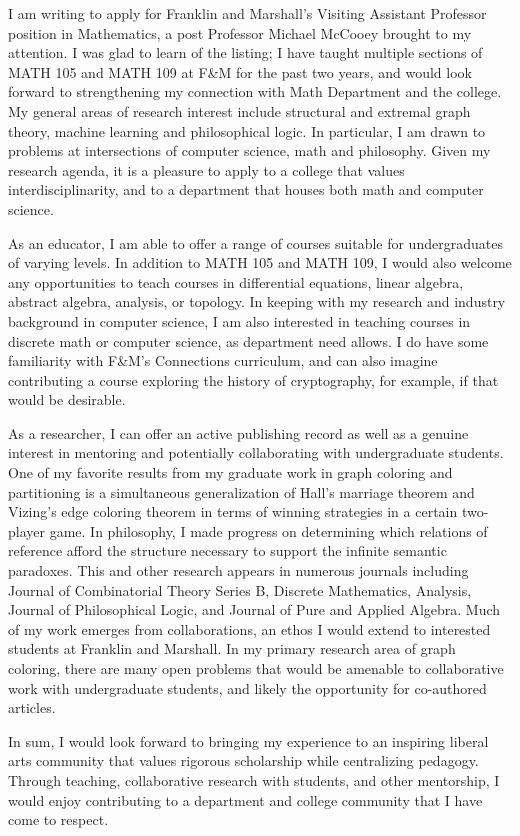 \documentclass[10pt,stdletter,dateno]{newlfm}
\begin{document}
\begin{newlfm}

I am writing to apply for Franklin and Marshall's Visiting Assistant Professor position in Mathematics, a post Professor Michael McCooey brought to my attention. 
I was glad to learn of the listing; 
I have taught multiple sections of MATH 105 and MATH 109 at F\&M for the past two years, and would look forward to strengthening my connection with Math Department 
and the college. My general areas of research interest include structural and extremal graph theory, machine learning and philosophical logic. In particular, I am 
drawn to problems at intersections of computer science, math and philosophy. Given my research agenda, it is a pleasure to apply to a college that values interdisciplinarity, 
and to a department that houses both math and computer science.  

As an educator, I am able to offer a range of courses suitable for undergraduates of varying levels. In addition to MATH 105 and MATH 109, 
I would also welcome any opportunities to teach courses in differential equations, linear algebra, abstract algebra, analysis, or topology. In keeping with 
my research and industry background in computer science, I am also interested in teaching courses in discrete math or computer science, as department need allows. 
I do have some familiarity with F\&M’s Connections curriculum, and can also imagine contributing a course exploring the history of cryptography, for example, if that would be desirable. 

As a researcher, I can offer an active publishing record as well as a genuine interest in mentoring and potentially collaborating with undergraduate students. 
One of my favorite results from my graduate work in graph coloring and partitioning is a simultaneous generalization of Hall's marriage theorem and Vizing's edge 
coloring theorem in terms of winning strategies in a certain two-player game. In philosophy, I made progress on determining which relations of reference afford the 
structure necessary to support the infinite semantic paradoxes. This and other research appears in numerous journals including Journal of Combinatorial Theory Series B, 
Discrete Mathematics, Analysis, Journal of Philosophical Logic, and Journal of Pure and Applied Algebra. Much of my work emerges from collaborations, an ethos I would 
extend to interested students at Franklin and Marshall. In my primary research area of graph coloring, there are many open problems that would be amenable to collaborative 
work with undergraduate students, and likely the opportunity for co-authored articles. 

In sum, I would look forward to bringing my experience to an inspiring liberal arts community that values rigorous scholarship while centralizing pedagogy. Through 
teaching, collaborative research with students, and other mentorship, I would enjoy contributing to a department and college community that I have come to respect.
\end{newlfm}
\end{document}
